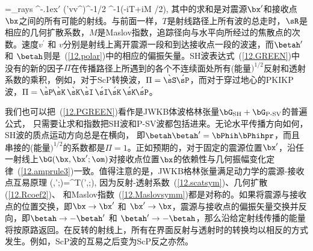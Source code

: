 \eq \label{12.PGREEN}
\bG=\sum_{\rm rays}
\betah\betah^{\raise-.1ex\hbox{$\scriptstyle\prime$}}
(\rho\rho'vv^{})^{-1/2}\hspace{0.2 mm}
\Pi\hspace{0.2 mm}\sR^{-1}\exp(-i\om T+iM\pi
\hspace{-0.2 mm}/2),
\en
其中的求和是对震源$\bx'$和接收点$\bx$之间的所有可能的射线。与前面一样，$T$是射线路径上所有波的总走时，$\sR$是相应的几何扩散系数，$M$是Maslov指数，追踪径向与水平向所经过的焦散点的次数。速度$v^{\prime}$ 和
$v$分别是射线上离开震源一段和到达接收点一段的波速，而$\betah^{\raise-.1ex\hbox{$\scriptstyle\prime$}}$ 和
$\betah$则是~(\ref{12.polar})中的相应的偏振矢量。SH波表达式~(\ref{12.GREEN})中没有的新的因子$\Pi$在传播路径上所遇到的各个不连续面处所有(能量$)^{1/2}$反射和透射系数的乘积，例如，对于ScP转换波，$\Pi=\grave{\sS}\hspace{-0.1 mm}\acute{\sP}$，而对于穿过地心的PKIKP波，$\Pi=\grave{\sP}\hspace{-0.3 mm}
\grave{\sK}\,\grave{\sK}\grave{\sI}\hspace{0.6 mm}
\acute{\sI}\hspace{-0.1 mm}\acute{\sK}\,
\acute{\sK}\hspace{-0.2 mm}\acute{\sP}$。

我们也可以把~(\ref{12.PGREEN})看作是JWKB体波格林张量$\bG_{\rm SH}+\bG_{\rm P\mbox{\scriptsize -}SV}$的普遍公式，
只需要让求和指数把SH波和P-SV波都包括进来。无论水平传播方向如何，SH波的质点运动方向总是在横向，
%
%
即$\betah\betah'=\bPhih\bPhihpr$，而且串接的(能量$)^{1/2}$的系数都是$\Pi=1$。正如预期的，对于固定的震源位置$\bx'$，沿任一射线上$\bG(\bx,\bx';\om)$对接收点位置$\bx$的依赖性与几何振幅变化定律~(\ref{12.amprule3})一致。值得注意的是，JWKB格林张量满足动力学的震源-接收点互易原理
%
\eq
\bG(\bx,\bx';\om)=\bG^{\rm T}(\bx',\bx;\om),
\en
因为反射-透射系数~(\ref{12.scatsym})、几何扩散 (\ref{12.Rcoef2})、
和Maslov指数~(\ref{12.Maslovsymm})都是对称的。如果将震源与接收点的位置交换，即$\bx\rightarrow\bx'$ 和 $\bx'\rightarrow\bx$，震源与接收点的偏振矢量交换并反向，即$\betah\rightarrow -\betah^{\raise-.1ex\hbox{$\scriptstyle\prime$}}$
和 $\betah^{\raise-.1ex\hbox{$\scriptstyle\prime$}}\rightarrow -\betah$，那么沿给定射线传播的能量将按原路返回。在反转的射线上，所有在界面反射与透射时的转换均以相反的方式发生。例如，ScP波的互易之后变为ScP反之亦然。
%
%

\renewcommand{\thesubsection}{$\!\!\!\raise1.3ex\hbox{$\star$}\!\!$
\arabic{chapter}.\arabic{section}.\arabic{subsection}}
